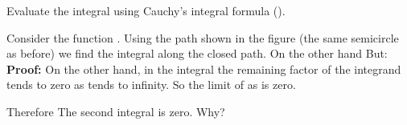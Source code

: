 \begin{EMexample}{}

Evaluate the integral  using Cauchy's integral formula ().

Consider the function . Using the path shown in the figure (the same semicircle as before) we find the integral along the closed path.
On the other hand
But:
\textbf{Proof:}
On the other hand, in the integral  the remaining factor of the integrand tends to zero as  tends to infinity. So the limit of  as  is zero.

Therefore
The second integral is zero. Why?

\end{EMexample}

